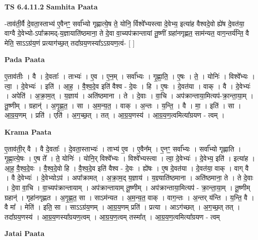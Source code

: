 \documentclass[17pt]{extarticle}
\begin{document}
\textbf{TS 6.4.11.2 } \newline
\textbf{Samhita Paata} \newline

-ताव॑ती॒र्वै दे॒वता॒स्ताभ्य॑ ए॒वैनꣳ॒॒ सर्वा᳚भ्यो गृह्णात्ये॒ष ते॒ योनि॒ र्विश्वे᳚भ्यस्त्वा दे॒वेभ्य॒ इत्या॑ह वैश्वदे॒वो ह्ये॑ष दे॒वत॑या॒ वाग्वै दे॒वेभ्यो-ऽपा᳚क्रामद्-य॒ज्ञायाति॑ष्ठमाना॒ ते दे॒वा वा॒च्यप॑क्रान्तायां तू॒ष्णीं ग्रहा॑नगृह्णत॒ साम॑न्यत॒ वाग॒न्तर्य॑न्ति॒ वै मेति॒ साऽऽग्र॑य॒णं प्रत्याग॑च्छ॒त् तदा᳚ग्रय॒णस्या᳚ऽऽग्रयण॒त्वं- [  ] \newline

\textbf{Pada Paata} \newline

ए॒ताव॑तीः । वै । दे॒वताः᳚ । ताभ्यः॑ । ए॒व । ए॒न॒म् । सर्वा᳚भ्यः । गृ॒ह्णा॒ति॒ । ए॒षः । ते॒ । योनिः॑ । विश्वे᳚भ्यः । त्वा॒ । दे॒वेभ्यः॑ । इति॑ । आ॒ह॒ । वै॒श्व॒दे॒व इति॑ वैश्व - दे॒वः । हि । ए॒षः । दे॒वत॑या । वाक् । वै । दे॒वेभ्यः॑ । अपेति॑ । अ॒क्रा॒म॒त् । य॒ज्ञाय॑ । अति॑ष्ठमाना । ते । दे॒वाः । वा॒चि । अप॑क्रान्ताया॒मित्यप॑-क्रा॒न्ता॒या॒म् । तू॒ष्णीम् । ग्रहान्॑ । अ॒गृ॒ह्ण॒त॒ । सा । अ॒म॒न्य॒त॒ । वाक् । अ॒न्तः । य॒न्ति॒ । वै । मा॒ । इति॑ । सा । आ॒ग्र॒य॒णम् । प्रति॑ । एति॑ । अ॒ग॒च्छ॒त् । तत् । आ॒ग्र॒य॒णस्य॑ । आ॒ग्र॒य॒ण॒त्वमित्या᳚ग्रयण - त्वम् ।  \newline


\textbf{Krama Paata} \newline

ए॒ताव॑ती॒र् वै । वै दे॒वताः᳚ । दे॒वता॒स्ताभ्यः॑ । ताभ्य॑ ए॒व । ए॒वैन᳚म् । ए॒नꣳ॒॒ सर्वा᳚भ्यः । सर्वा᳚भ्यो गृह्णाति । गृ॒ह्णा॒त्ये॒षः । ए॒ष ते᳚ । ते॒ योनिः॑ । योनि॒र् विश्वे᳚भ्यः । विश्वे᳚भ्यस्त्वा । त्वा॒ दे॒वेभ्यः॑ । दे॒वेभ्य॒ इति॑ । इत्या॑ह । आ॒ह॒ वै॒श्व॒दे॒वः । वै॒श्व॒दे॒वो हि । वै॒श्व॒दे॒व इति॑ वैश्व - दे॒वः । ह्ये॑षः । ए॒ष दे॒वत॑या । दे॒वत॑या॒ वाक् । वाग् वै । वै दे॒वेभ्यः॑ । दे॒वेभ्योऽप॑ । अपा᳚क्रामत् । अ॒क्रा॒म॒द् य॒ज्ञाय॑ । य॒ज्ञ्याति॑ष्ठमाना । अति॑ष्ठमाना॒ ते । ते दे॒वाः । दे॒वा वा॒चि । वा॒च्यप॑क्रान्तायाम् । अप॑क्रान्तायाम् तू॒ष्णीम् । अप॑क्रान्ताया॒मित्यप॑ - क्रा॒न्ता॒या॒म् । तू॒ष्णीम् ग्रहान्॑ । गृहा॑नगृह्णत । अ॒गृ॒ह्ण॒त॒ सा । साऽम॑न्यत । अ॒म॒न्य॒त॒ वाक् । वाग॒न्तः । अ॒न्तर् य॑न्ति । य॒न्ति॒ वै । वै मा᳚ । मेति॑ । इति॒ सा । साऽऽग्र॑य॒णम् । आ॒ग्र॒य॒णम् प्रति॑ । प्रत्या । आऽग॑च्छत् । अ॒ग॒च्छ॒त् तत् । तदा᳚ग्रय॒णस्य॑ । आ॒ग्र॒य॒णस्या᳚ग्रयण॒त्वम् । आ॒ग्र॒य॒ण॒त्वम् तस्मा᳚त् । आ॒ग्र॒य॒ण॒त्वमित्या᳚ग्रयण - त्वम् \newline

\textbf{Jatai Paata} \newline
\end{document}

